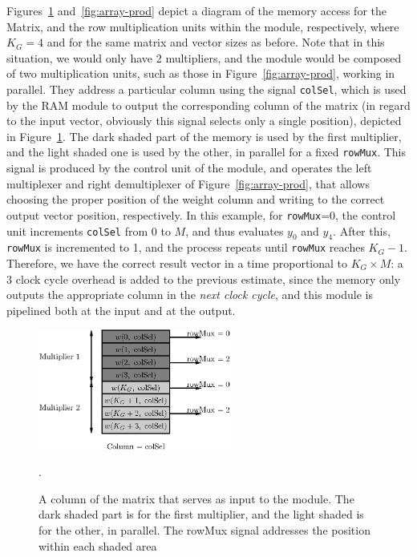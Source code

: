 \documentclass{IEEEtran}
\begin{document}
Figures~\ref{fig:mem-arrayprod} and~\ref{fig:array-prod} depict a diagram of the memory access for the Matrix, and the row multiplication
units within the module, respectively, where $K_G = 4$ and for the same matrix and vector sizes as before. Note that in this situation,
we would only have 2 multipliers, and the module would be composed of two multiplication units, such as those in Figure~\ref{fig:array-prod},
working in parallel. They address a particular column using the signal \verb+colSel+, which is used by the RAM module to output the corresponding
column of the matrix (in regard to the input vector, obviously this signal selects only a single position), depicted in Figure~\ref{fig:mem-arrayprod}.
The dark shaded part of the memory is used by the first multiplier, and the light shaded one is used by the other, in parallel for a
fixed \verb+rowMux+. This signal is produced by the control unit of the module, and operates the left multiplexer and right demultiplexer
of Figure~\ref{fig:array-prod}, that allows choosing the proper position of the weight column and writing to the correct output vector position, respectively.
In this example, for \verb+rowMux+=0, the control unit increments \verb+colSel+ from 0 to $M$, and thus evaluates $y_0$ and $y_4$. After this, \verb+rowMux+
is incremented to 1, and the process repeats until \verb+rowMux+ reaches $K_G-1$. Therefore, we have the correct result vector in a time
proportional to $K_G \times M$: a 3 clock cycle overhead is added to the previous estimate, since the memory only outputs the appropriate column
in the \emph{next clock cycle}, and this module is pipelined both at the input and at the output.

\begin{figure}
    \centering
    \includegraphics[width=2.5in]{figures/mem-array-prod.eps}
    \caption{A column of the matrix that serves as input to the module. The dark shaded part is for the first multiplier, and the light shaded is for the other, in parallel. The rowMux signal addresses the position within each shaded area}.
    \label{fig:mem-arrayprod}
\end{figure}
\end{document}
